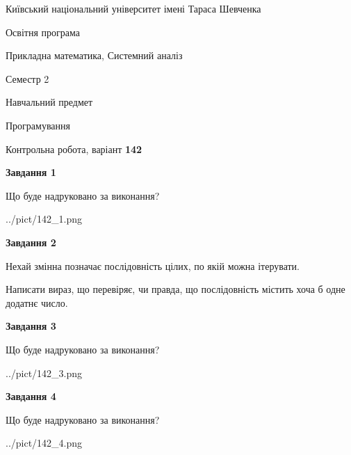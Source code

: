 \documentclass[12pt, ukrainian]{article}
\begin{document}
{{\begin {small}\par
{ \center  Київський національний університет імені Тараса Шевченка \par}
{\parbox {5 cm}{Освітня програма \hfill}{\parbox {8 cm}{Прикладна математика, Системний аналіз \hfill}}\parbox {5 cm}{\hfill Семестр 2}}\par
{\parbox {5 cm} {Навчальний предмет \hfill}\parbox {7 cm}{Програмування \hfill}\parbox {6cm}{\hfill}\par}\vspace{-7pt} \end{small}}{\center Контрольна робота, варіант  \No \textbf
{ 142 }\par}}
{
\begin {large}
{\begin {center}\textbf{Завдання 1}\end {center}}\par
Що буде надруковано за виконання?\par\par
\begin{center}
	{../pict/142_1.png}
\end{center}
\newpage

{\begin {center}\textbf{Завдання 2}\end {center}}\par
Нехай змінна  позначає послідовність цілих, по якій можна ітерувати.

Написати вираз, що перевіряє, чи правда, що послідовність  містить хоча б одне додатнє число.\par
\newpage

{\begin {center}\textbf{Завдання 3}\end {center}}\par
Що буде надруковано за виконання?
\begin{center}
	{../pict/142_3.png}
\end{center}
\newpage

{\begin {center}\textbf{Завдання 4}\end {center}}\par
Що буде надруковано за виконання?\par
\begin{center}
	{../pict/142_4.png}
\end{center}
\newpage


\end{large}}
\end{document}
